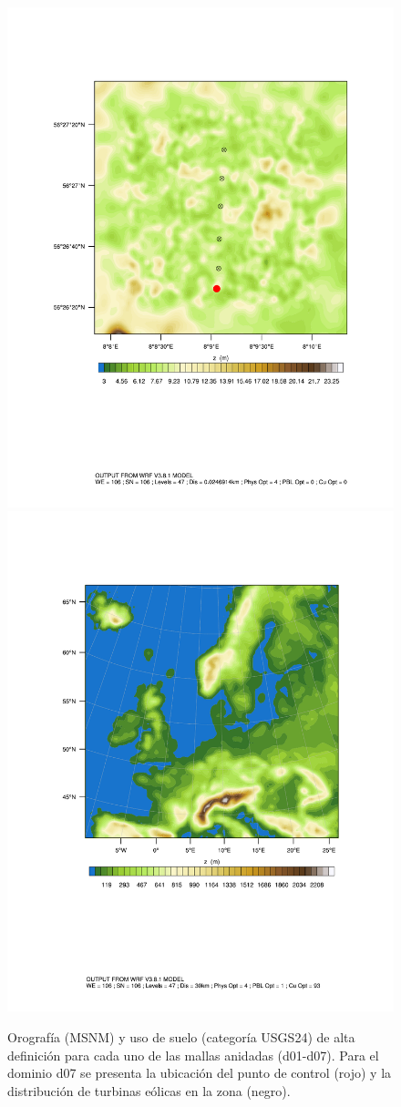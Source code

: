 \begin{figure}[H]
	\bigskip
	\includegraphics[width=0.25\linewidth,page=1,trim={2cm 6.5cm 1cm 3.5cm},clip]{Imagenes/05/hov_control_point.pdf}%
	\includegraphics[width=0.25\linewidth,page=14,trim={2cm 6.5cm 1cm 3.5cm},clip]{Imagenes/05/hov_domain.pdf}%
	
	\caption{Orografía (MSNM) y uso de suelo (categoría USGS24) de alta definición para cada uno de las mallas anidadas (d01-d07). Para el dominio d07 se presenta la ubicación del punto de control (rojo) y la distribución de turbinas eólicas en la zona (negro).}
	\label{fig:dominios}
\end{figure}
\newpage

